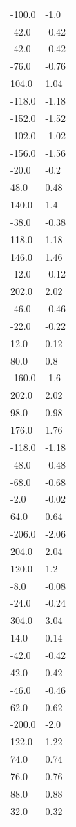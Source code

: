 \begin{longtable}{ll}
-100.0 & -1.0 \\
-42.0 & -0.42 \\
-42.0 & -0.42 \\
-76.0 & -0.76 \\
104.0 & 1.04 \\
-118.0 & -1.18 \\
-152.0 & -1.52 \\
-102.0 & -1.02 \\
-156.0 & -1.56 \\
-20.0 & -0.2 \\
48.0 & 0.48 \\
140.0 & 1.4 \\
-38.0 & -0.38 \\
118.0 & 1.18 \\
146.0 & 1.46 \\
-12.0 & -0.12 \\
202.0 & 2.02 \\
-46.0 & -0.46 \\
-22.0 & -0.22 \\
12.0 & 0.12 \\
80.0 & 0.8 \\
-160.0 & -1.6 \\
202.0 & 2.02 \\
98.0 & 0.98 \\
176.0 & 1.76 \\
-118.0 & -1.18 \\
-48.0 & -0.48 \\
-68.0 & -0.68 \\
-2.0 & -0.02 \\
64.0 & 0.64 \\
-206.0 & -2.06 \\
204.0 & 2.04 \\
120.0 & 1.2 \\
-8.0 & -0.08 \\
-24.0 & -0.24 \\
304.0 & 3.04 \\
14.0 & 0.14 \\
-42.0 & -0.42 \\
42.0 & 0.42 \\
-46.0 & -0.46 \\
62.0 & 0.62 \\
-200.0 & -2.0 \\
122.0 & 1.22 \\
74.0 & 0.74 \\
76.0 & 0.76 \\
88.0 & 0.88 \\
32.0 & 0.32 \\

\end{longtable}

